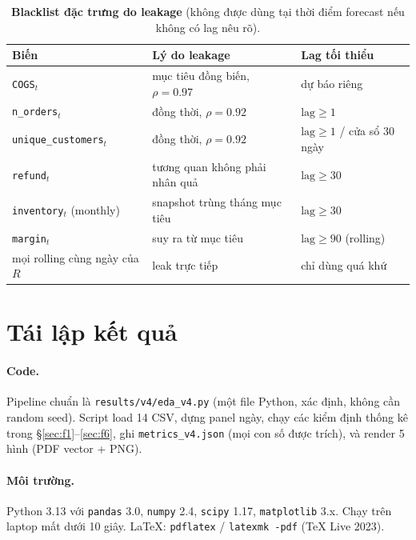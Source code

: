 \documentclass{article}
\begin{document}
\begin{table}[h]
  \caption{\textbf{Blacklist đặc trưng do leakage} (không được dùng tại thời điểm forecast nếu không có lag nêu rõ).}
  \label{tab:blacklist}
  \centering
  \small
  \begin{tabular}{@{}l l l@{}}
    \toprule
    \textbf{Biến} & \textbf{Lý do leakage} & \textbf{Lag tối thiểu} \\
    \midrule
    \texttt{COGS}$_t$                  & mục tiêu đồng biến, $\rho=0.97$     & dự báo riêng \\
    \texttt{n\_orders}$_t$             & đồng thời, $\rho=0.92$              & $\text{lag}\ge 1$ \\
    \texttt{unique\_customers}$_t$     & đồng thời, $\rho=0.92$              & $\text{lag}\ge 1$ / cửa sổ 30 ngày \\
    \texttt{refund}$_t$                & tương quan không phải nhân quả       & $\text{lag}\ge 30$ \\
    \texttt{inventory}$_t$ (monthly)   & snapshot trùng tháng mục tiêu        & $\text{lag}\ge 30$ \\
    \texttt{margin}$_t$                & suy ra từ mục tiêu                   & $\text{lag}\ge 90$ (rolling) \\
    mọi rolling cùng ngày của $R$      & leak trực tiếp                       & chỉ dùng quá khứ \\
    \bottomrule
  \end{tabular}
\end{table}

\section{Tái lập kết quả}
\label{app:repro}

\paragraph{Code.} Pipeline chuẩn là \texttt{results/v4/eda\_v4.py} (một file Python, xác định, không cần random seed). Script load 14 CSV, dựng panel ngày, chạy các kiểm định thống kê trong \S\ref{sec:f1}--\ref{sec:f6}, ghi \texttt{metrics\_v4.json} (mọi con số được trích), và render 5 hình (PDF vector + PNG).

\paragraph{Môi trường.} Python 3.13 với \texttt{pandas} 3.0, \texttt{numpy} 2.4, \texttt{scipy} 1.17, \texttt{matplotlib} 3.x. Chạy trên laptop mất dưới 10 giây. LaTeX: \texttt{pdflatex} / \texttt{latexmk -pdf} (TeX Live 2023).
\end{document}
